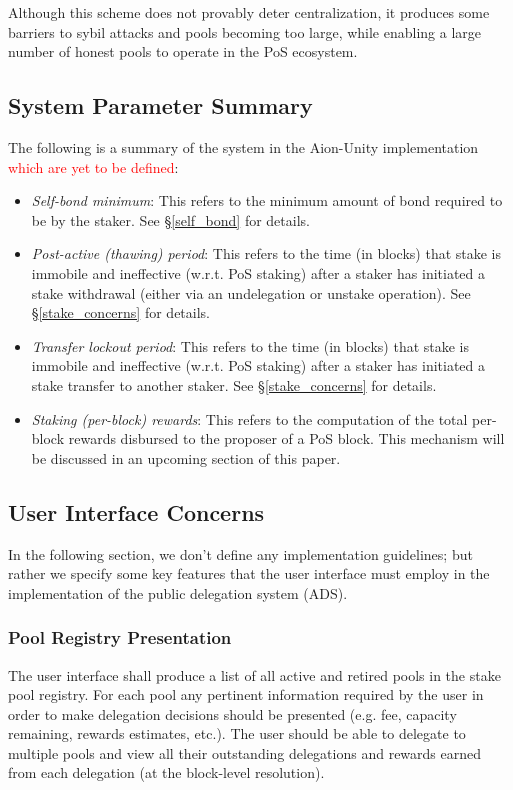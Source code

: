 Although this scheme does not provably deter centralization, it produces some barriers to sybil attacks and pools becoming too large, while enabling a large number of honest pools to operate in the PoS ecosystem.

\subsection{System Parameter Summary} \label{unspecified_parameters}
The following is a summary of the system in the Aion-Unity implementation \textcolor{red}{which are yet to be defined}: 
\begin{itemize}
    \item \textit{Self-bond minimum}: This refers to the minimum amount of bond required to be  by the staker. See \S\ref{self_bond} for details.
    \item \textit{Post-active (thawing) period}: This refers to the time (in blocks) that stake is immobile and ineffective (w.r.t. PoS staking) after a staker has initiated a stake withdrawal (either via an undelegation or unstake operation). See \S\ref{stake_concerns} for details. 
    \item \textit{Transfer lockout period}: This refers to the time (in blocks) that stake is immobile and ineffective (w.r.t. PoS staking) after a staker has initiated a stake transfer to another staker. See \S\ref{stake_concerns} for details. 
    \item \textit{Staking (per-block) rewards}: This refers to the computation of the total per-block rewards disbursed to the proposer of a PoS block. This mechanism will be discussed in an upcoming section of this paper. 
\end{itemize}

\subsection{User Interface Concerns} \label{ads_ui}
In the following section, we don't define any implementation guidelines; but rather we specify some key features that the user interface must employ in the implementation of the public delegation system (ADS). 

\subsubsection{Pool Registry Presentation} \label{registry_presentation}
The user interface shall produce a list of all active and retired pools in the stake pool registry. For each pool any pertinent information required by the user in order to make delegation decisions should be presented (e.g. fee, capacity remaining, rewards estimates, etc.). The user should be able to delegate to multiple pools and view all their outstanding delegations and rewards earned from each delegation (at the block-level resolution). 

